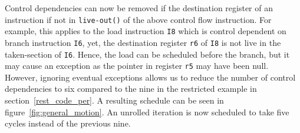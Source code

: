 Control dependencies can now be removed if the destination register of an instruction if not in \texttt{live-out()} of the above control flow instruction. For example, this applies to the load instruction \texttt{I8} which is control dependent on branch instruction \texttt{I6}, yet, the destination register \texttt{r6} of \texttt{I8} is not live in the taken-section of \texttt{I6}. Hence, the load can be scheduled before the branch, but it may cause an exception as the pointer in register \texttt{r5} may have been null. However, ignoring eventual exceptions allows us to reduce the number of control dependencies to six compared to the nine in the restricted example in section~\ref{rest_code_per}. A resulting schedule can be seen in figure~\ref{fig:general_motion}. An unrolled iteration is now scheduled to take five cycles instead of the previous nine. 

